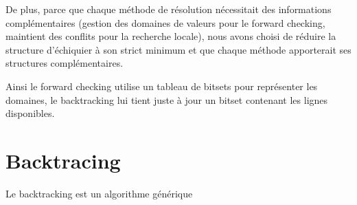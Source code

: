 \documentclass[10pt,a4paper]{report}
\begin{document}
De plus, parce que chaque méthode de résolution nécessitait des informations complémentaires (gestion des domaines de valeurs pour le forward checking, maintient des conflits pour la recherche locale),
nous avons choisi de réduire la structure d'échiquier à son strict minimum et que chaque méthode apporterait ses structures complémentaires.

Ainsi le forward checking utilise un tableau de bitsets pour représenter les domaines, le backtracking lui tient juste à jour un bitset contenant les lignes disponibles.


\section{Backtracing}

Le backtracking est un algorithme générique 




\end{document}
